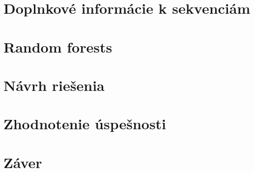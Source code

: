 


\chapter{Doplnkové informácie k sekvenciám}
\chapter{Random forests}
\chapter{Návrh riešenia}

\chapter{Zhodnotenie úspešnosti}
{}
\chapter*{Záver}
